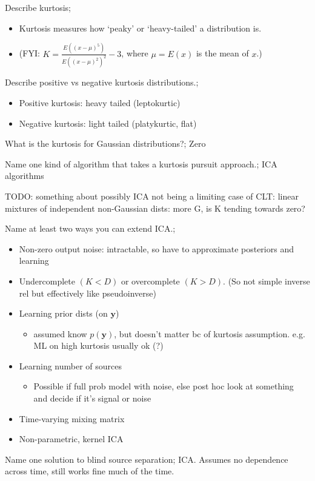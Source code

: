 \documentclass{article}
\begin{document}
Describe kurtosis; \begin{itemize} \item Kurtosis measures how `peaky' or `heavy-tailed' a distribution is. \item (FYI: $K=\frac{E((x-\mu)^5)}{E((x-\mu)^2)^2}-3$, where $\mu=E(x)$ is the mean of $x$.) \end{itemize}

Describe positive vs negative kurtosis distributions.; \begin{itemize} \item Positive kurtosis: heavy tailed (leptokurtic) \item Negative kurtosis: light tailed (platykurtic, flat) \end{itemize}

What is the kurtosis for Gaussian distributions?; Zero

Name one kind of algorithm that takes a kurtosis pursuit approach.; ICA algorithms

TODO: something about possibly ICA not being a limiting case of CLT: linear mixtures of independent non-Gaussian dists: more G, is K tending towards zero?

Name at least two ways you can extend ICA.; \begin{itemize} \item Non-zero output noise: intractable, so have to approximate posteriors and learning \item Undercomplete $(K<D)$ or overcomplete $(K>D)$. (So not simple inverse rel but effectively like pseudoinverse) \item Learning prior dists (on $\mathbf{y}$) \begin{itemize} \item assumed know $p(\mathbf{y})$, but doesn't matter bc of kurtosis assumption. e.g. ML on high kurtosis usually ok (?) \end{itemize} \item Learning number of sources \begin{itemize} \item Possible if full prob model with noise, else post hoc look at something and decide if it's signal or noise \end{itemize} \item Time-varying mixing matrix \item Non-parametric, kernel ICA \end{itemize}

Name one solution to blind source separation; ICA. Assumes no dependence across time, still works fine much of the time.
\end{document}
